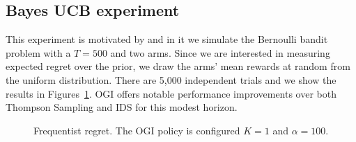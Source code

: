 \subsection{Bayes UCB experiment} \label{exp:bayes_ucb}
This experiment is motivated by \cite{kaufmann2012thompson} and in it we simulate the Bernoulli bandit problem with a $T = 500$ and two arms. Since we are interested in measuring expected regret over the prior, we draw the arms' mean rewards at random from the uniform distribution. There are 5,000 independent trials and we show the results in Figures~\ref{fig:kaufmann_regret}. OGI offers notable performance improvements over both Thompson Sampling and IDS for this modest horizon.
\begin{figure}[h!]
	\centering
	
	\caption{Frequentist regret. The OGI policy is configured $K=1$ and $\alpha=100$.}
	\label{fig:kaufmann_regret}
\end{figure}
